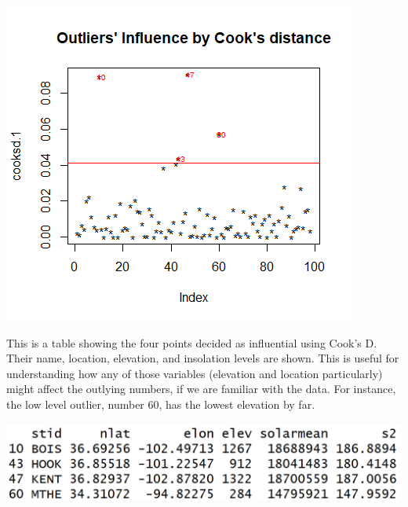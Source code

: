 \documentclass{article}
\begin{document}
\includegraphics{outliers}

This is a table showing the four points decided as influential using Cook's D. Their name, location, elevation, and insolation levels are shown. This is useful for understanding how any of those variables (elevation and location particularly) might affect the outlying numbers, if we are familiar with the data. For instance, the low level outlier, number 60, has the lowest elevation by far. 

\includegraphics{influential}
\end{document}
